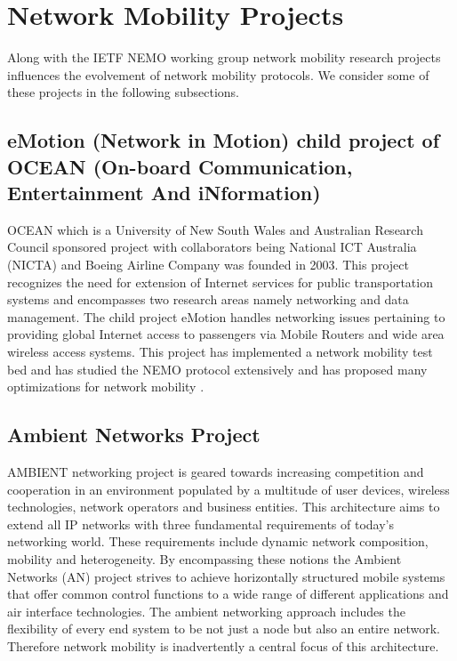 \section{Network Mobility Projects}

Along with the IETF NEMO working group network mobility research projects
influences the evolvement of network mobility protocols. We consider some of
these projects in the following subsections.

\subsection{eMotion (Network in Motion) child project of OCEAN (On-board
Communication, Entertainment And iNformation)}

OCEAN \cite{42} which is a University of New South Wales and Australian
Research Council sponsored project with collaborators being National ICT
Australia (NICTA) \cite{43} and Boeing Airline Company was founded in 2003.
This project recognizes the need for extension of Internet services for public
transportation systems and encompasses two research areas namely networking
and data management. The child project eMotion \cite{44} handles networking
issues pertaining to providing global Internet access to passengers via Mobile
Routers and wide area wireless access systems. This project has implemented a
network mobility test bed \cite{45} and has studied the NEMO protocol extensively and
has proposed many optimizations for network mobility \cite{16}.

\subsection{Ambient Networks Project}

AMBIENT networking project \cite{21} is geared towards increasing competition and cooperation in an environment populated by a multitude of user devices, wireless technologies, network operators and business entities. This architecture aims to extend all IP networks with three fundamental requirements of today's networking world. These requirements include dynamic network composition, mobility and heterogeneity.  By encompassing these notions the Ambient Networks (AN) project strives to achieve horizontally structured mobile systems that offer common control functions to a wide range of different applications and air interface technologies. The ambient networking approach includes the flexibility of every end system to be not just a node but also an entire network. Therefore network mobility is inadvertently a central focus of this architecture.

